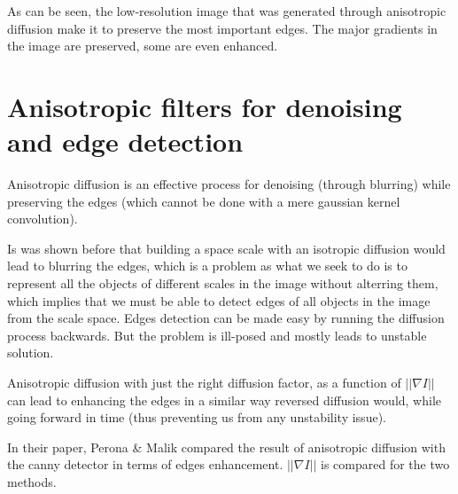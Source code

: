 \documentclass[12pt,a4paper]{book}
\begin{document}
As can be seen, the low-resolution image that was generated through anisotropic diffusion make it to preserve the most important edges. The major gradients in the image are preserved, some are even enhanced.

\section{Anisotropic filters for denoising and edge detection}

Anisotropic diffusion is an effective process for denoising (through blurring) while preserving the edges (which cannot be done with a mere gaussian kernel convolution). 

Is was shown before that building a space scale with an isotropic diffusion would lead to blurring the edges, which is a problem as what we seek to do is to represent all the objects of different scales in the image without alterring them, which implies that we must be able to detect edges of all objects in the image from the scale space.
Edges detection can be made easy by running the diffusion process backwards. But the problem is ill-posed and mostly leads to unstable solution.

Anisotropic diffusion with just the right diffusion factor, as a function of $|| \nabla I||$ can lead to enhancing the edges in a similar way reversed diffusion would, while going forward in time (thus preventing us from any unstability issue).

In their paper, Perona \& Malik compared the result of anisotropic diffusion with the canny detector in terms of edges enhancement. $|| \nabla I ||$ is compared for the two methods.
\end{document}
